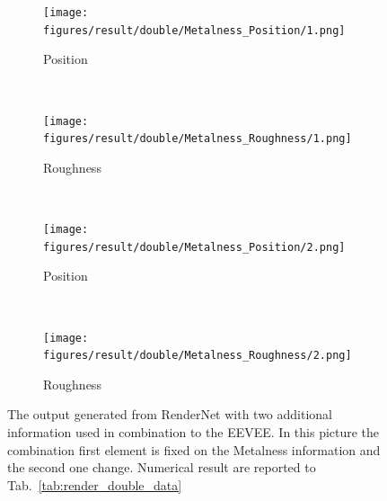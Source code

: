 \begin{figure}[h!]
    \centering
    \begin{subfigure}[b]{0.175\textwidth}
     \texttt{[image: figures/result/double/Metalness\_Position/1.png]}
     \caption{Position}\label{subfig:1}
    \end{subfigure}
    ~
    \begin{subfigure}[b]{0.175\textwidth}
     \texttt{[image: figures/result/double/Metalness\_Roughness/1.png]}
     \caption{Roughness}
    \end{subfigure}
    ~ 
    \begin{subfigure}[b]{0.175\textwidth}
     \texttt{[image: figures/result/double/Metalness\_Position/2.png]}
     \caption{Position}\label{subfig:1}
    \end{subfigure}
    ~
    \begin{subfigure}[b]{0.175\textwidth}
     \texttt{[image: figures/result/double/Metalness\_Roughness/2.png]}
     \caption{Roughness}
    \end{subfigure}
    \caption{The output generated from RenderNet with two additional information used in combination to the EEVEE. In this picture the combination first element is fixed on the Metalness information and the second one change. Numerical result are reported to Tab.~\ref{tab:render_double_data}}
    \label{fig:double_input_base_metalness_generation}
\end{figure}

